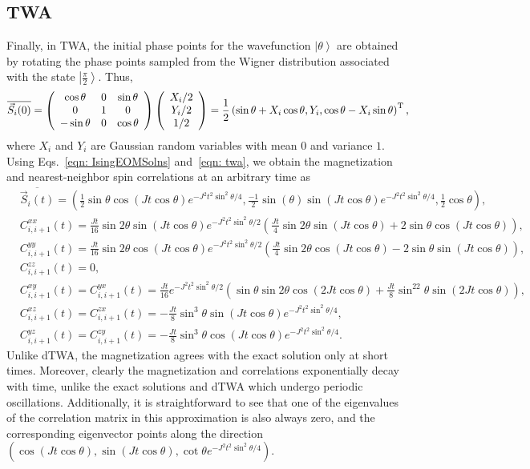 \documentclass[pra,reprint,superscriptaddress]{revtex4-1}
\newcommand{\ket}[1]{\left| #1 \right\rangle}
\begin{document}
\begin{widetext}
\subsection{TWA}
Finally, in TWA, the initial phase points for the wavefunction $\ket{\theta}$ are obtained by rotating the phase points sampled from the Wigner distribution associated with the state $\ket{\frac{\pi}{2}}$. Thus,
\begin{equation}\label{eqn: twa}
\overline{\vec{S}_i(0)} = \left(\begin{array}{ccc}\cos\theta&0&\sin\theta\\ 0&1&0\\ -\sin\theta&0&\cos\theta\end{array}\right) \left(\begin{array}{c}X_i/2\\ Y_i/2\\ 1/2\end{array}\right) 
= \frac{1}{2}\left( \sin\theta+X_i\cos\theta, Y_i, \cos\theta-X_i\sin\theta \right)^{\rm T},
\end{equation}
where $X_i$ and $Y_i$ are Gaussian random variables with mean $0$ and variance $1$. Using Eqs.~\eqref{eqn: IsingEOMSolns} and~\eqref{eqn: twa}, we obtain the magnetization and nearest-neighbor spin correlations at an arbitrary time as
\begin{align}
&\overline{\vec{S}_i(t)} = \left( \frac{1}{2}\sin\theta \cos(Jt\cos\theta)e^{-J^2t^2\sin^2\theta/4}, \frac{-1}{2}\sin(\theta) \sin(Jt\cos\theta)e^{-J^2t^2\sin^2\theta/4}, \frac{1}{2}\cos\theta \right),\nonumber\\
&C^{xx}_{i,i+1}(t) = \frac{Jt}{16}\sin2\theta\sin(Jt\cos\theta)e^{-J^2t^2\sin^2\theta/2} \left(\frac{Jt}{4}\sin2\theta\sin(Jt\cos\theta)+2\sin\theta\cos(Jt\cos\theta)\right),\nonumber\\
&C^{yy}_{i,i+1}(t) = \frac{Jt}{16}\sin2\theta\cos(Jt\cos\theta)e^{-J^2t^2\sin^2\theta/2} \left(\frac{Jt}{4}\sin2\theta\cos(Jt\cos\theta)-2\sin\theta\sin(Jt\cos\theta)\right),\nonumber\\
&C^{zz}_{i,i+1}(t) = 0, \nonumber\\
&C^{xy}_{i,i+1}(t) = C^{yx}_{i,i+1}(t) = \frac{Jt}{16}e^{-J^2t^2\sin^2\theta/2} \left(\sin\theta\sin2\theta\cos(2Jt\cos\theta) + \frac{Jt}{8}\sin^22\theta\sin(2Jt\cos\theta) \right), \nonumber\\
&C^{xz}_{i,i+1}(t) = C^{zx}_{i,i+1}(t) = -\frac{Jt}{8}\sin^3\theta\sin(Jt\cos\theta)e^{-J^2t^2\sin^2\theta/4},\nonumber\\
&C^{yz}_{i,i+1}(t) = C^{zy}_{i,i+1}(t) = -\frac{Jt}{8}\sin^3\theta\cos(Jt\cos\theta)e^{-J^2t^2\sin^2\theta/4}.
\end{align}
Unlike dTWA, the magnetization agrees with the exact solution only at short times. Moreover, clearly the magnetization and correlations exponentially decay with time, unlike the exact solutions and dTWA which undergo periodic oscillations. Additionally, it is straightforward to see that one of the eigenvalues of the correlation matrix in this approximation is also always zero, and the corresponding eigenvector points along the direction $\left(\cos(Jt\cos\theta), \sin(Jt\cos\theta), \cot\theta e^{-J^2t^2\sin^2\theta/4}\right)$.
\end{widetext}
\end{document}
